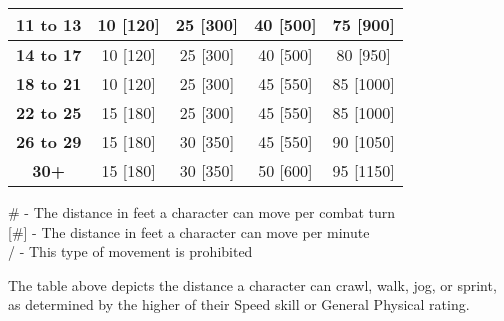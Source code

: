 \documentclass[oneside]{book}
\begin{document}
\begin{multicols}{2}
\begin{center}
{\begin{tabular}{|c|c|c|c|c|}
\rowcolor[HTML]{C0C0C0} 
\textbf{11 to 13}    & 10 {[}120{]}                                              & 25 {[}300{]}                                              & 40 {[}500{]}                                              & 75 {[}900{]}                                              \\ \hline
\rowcolor[HTML]{EFEFEF} 
\textbf{14 to 17}    & 10 {[}120{]}                                              & 25 {[}300{]}                                              & 40 {[}500{]}                                              & 80 {[}950{]}                                              \\ \hline
\rowcolor[HTML]{C0C0C0} 
\textbf{18 to 21}    & \multicolumn{1}{c|}{\cellcolor[HTML]{C0C0C0}10 {[}120{]}} & \multicolumn{1}{c|}{\cellcolor[HTML]{C0C0C0}25 {[}300{]}} & \multicolumn{1}{c|}{\cellcolor[HTML]{C0C0C0}45 {[}550{]}} & \multicolumn{1}{c|}{\cellcolor[HTML]{C0C0C0}85 {[}1000{]}} \\ \hline
\rowcolor[HTML]{EFEFEF} 
\textbf{22 to 25}    & 15 {[}180{]}                                              & 25 {[}300{]}                                              & 45 {[}550{]}                                              & 85 {[}1000{]}                                             \\ \hline
\rowcolor[HTML]{C0C0C0} 
\textbf{26 to 29}    & 15 {[}180{]}                                              & 30 {[}350{]}                                              & 45 {[}550{]}                                              & 90 {[}1050{]}                                             \\ \hline
\rowcolor[HTML]{EFEFEF} 
\textbf{30+}         & 15 {[}180{]}                                              & 30 {[}350{]}                                              & 50 {[}600{]}                                              & 95 {[}1150{]}                                             \\ \hline
\end{tabular}
}
\end{center}
\tiny \# - The distance in feet a character can move per combat turn \\[0pt]
[\#] - The distance in feet a character can move per minute \\
/ - This type of movement is prohibited

\normalsize
The table above depicts the distance a character can crawl, walk, jog, or sprint, as determined by the higher of their Speed skill or General Physical rating.


\end{multicols}
\end{document}
